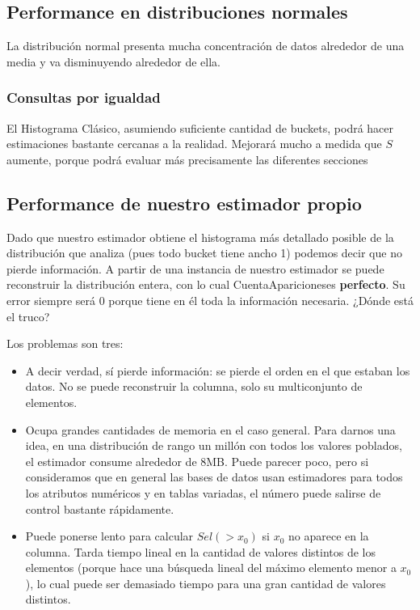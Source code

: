 \subsection{Performance en distribuciones normales}
La distribución normal presenta mucha concentración de datos alrededor de una media y va disminuyendo alrededor de ella.

\subsubsection{Consultas por igualdad}
El Histograma Clásico, asumiendo suficiente cantidad de buckets, podrá hacer estimaciones bastante cercanas a la realidad. Mejorará mucho a medida que $S$ aumente, porque podrá evaluar más precisamente las diferentes secciones 


\subsection{Performance de nuestro estimador propio}
Dado que nuestro estimador obtiene el histograma más detallado posible de la distribución que analiza (pues todo bucket tiene ancho 1) podemos decir que no pierde información. A partir de una instancia de nuestro estimador se puede reconstruir la distribución entera, con lo cual CuentaApariciones\texttrademark es \textbf{perfecto}. Su error siempre será 0 porque tiene en él toda la información necesaria. ¿Dónde está el truco?

Los problemas son tres:
\begin{itemize}
 \item A decir verdad, sí pierde información: se pierde el orden en el que estaban los datos. No se puede reconstruir la columna, solo su multiconjunto de elementos.
 \item Ocupa grandes cantidades de memoria en el caso general. Para darnos una idea, en una distribución de rango un millón con todos los valores poblados, el estimador consume alrededor de 8MB. Puede parecer poco, pero si consideramos que en general las bases de datos usan estimadores para todos los atributos numéricos y en tablas variadas, el número puede salirse de control bastante rápidamente.
 \item Puede ponerse lento para calcular $Sel(>x_0)$ si $x_0$ no aparece en la columna. Tarda tiempo lineal en la cantidad de valores distintos de los elementos (porque hace una búsqueda lineal del máximo elemento menor a $x_0$), lo cual puede ser demasiado tiempo para una gran cantidad de valores distintos.
\end{itemize}

